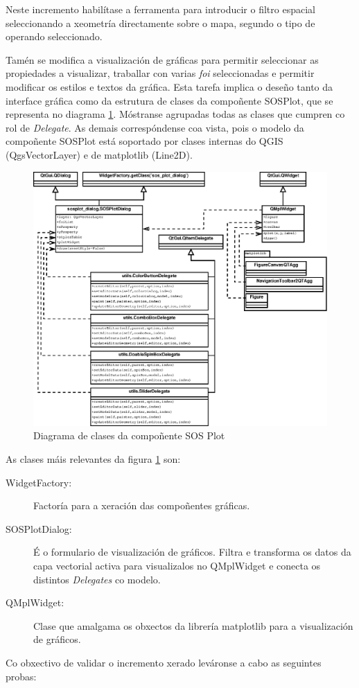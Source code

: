 Neste incremento habilítase a ferramenta para introducir o filtro espacial seleccionando a xeometría directamente sobre o mapa, segundo o tipo de operando seleccionado.

Tamén se modifica a visualización de gráficas para permitir seleccionar as propiedades a visualizar, traballar con varias \emph{foi} seleccionadas e permitir modificar os estilos e textos da gráfica. Esta tarefa implica o deseño tanto da interface gráfica como da estrutura de clases da compoñente SOSPlot, que se representa no diagrama \ref{fig:diaClassSOSPlot}. Móstranse agrupadas todas as clases que cumpren co rol de \emph{Delegate}. As demais correspóndense coa vista, pois o modelo da compoñente SOSPlot está soportado por clases internas do QGIS (QgsVectorLayer) e de matplotlib (Line2D).

\begin{figure}
 \centering
 \includegraphics[width=.8\textwidth]{images/clases_sos_plot.eps}
 \caption{Diagrama de clases da compoñente SOS Plot}
 \label{fig:diaClassSOSPlot}
\end{figure}

As clases máis relevantes da figura \ref{fig:diaClassSOSPlot} son:
\begin{description}
\item[WidgetFactory:] Factoría para a xeración das compoñentes gráficas.
\item[SOSPlotDialog:] É o formulario de visualización de gráficos. Filtra e transforma os datos da capa vectorial activa para visualizalos no QMplWidget e conecta os distintos \emph{Delegates} co modelo.
\item[QMplWidget:] Clase que amalgama os obxectos da librería matplotlib para a visualización de gráficos.
\end{description}
\newpage
Co obxectivo de validar o incremento xerado leváronse a cabo as seguintes probas:

